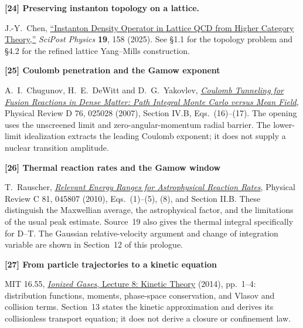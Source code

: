 \documentclass[11pt]{article}
\newcommand{\source}[3]{\par\medskip\hypertarget{src#1}{}\textbf{[#1] #2}\par\nopagebreak #3\par}
\begin{document}
\source{24}{Preserving instanton topology on a lattice.}{J.-Y.~Chen,
\href{https://arxiv.org/abs/2406.06673v3}{``Instanton Density Operator in
Lattice QCD from Higher Category Theory,''} \emph{SciPost Physics}
\textbf{19}, 158 (2025). See \S1.1 for the topology problem and \S4.2
for the refined lattice Yang--Mills construction.}


\source{25}{Coulomb penetration and the Gamow exponent}{A.~I.~Chugunov, H.~E.~DeWitt and D.~G.~Yakovlev, \href{https://arxiv.org/abs/0707.3500}{\emph{Coulomb Tunneling for Fusion Reactions in Dense Matter: Path Integral Monte Carlo versus Mean Field}}, Physical Review D 76, 025028 (2007), Section IV.B, Eqs.~(16)--(17). The opening uses the unscreened limit and zero-angular-momentum radial barrier. The lower-limit idealization extracts the leading Coulomb exponent; it does not supply a nuclear transition amplitude.}

\source{26}{Thermal reaction rates and the Gamow window}{T.~Rauscher, \href{https://arxiv.org/abs/1003.2802}{\emph{Relevant Energy Ranges for Astrophysical Reaction Rates}}, Physical Review C 81, 045807 (2010), Eqs.~(1)--(5), (8), and Section II.B. These distinguish the Maxwellian average, the astrophysical factor, and the limitations of the usual peak estimate. Source~19 also gives the thermal integral specifically for D--T. The Gaussian relative-velocity argument and change of integration variable are shown in Section~12 of this prologue.}

\source{27}{From particle trajectories to a kinetic equation}{MIT 16.55, \href{https://ocw.mit.edu/courses/16-55-ionized-gases-fall-2014/b7c22c3d68ab558bcc3a59867b710e1a_MIT16_55F14_Lecture8.pdf}{\emph{Ionized Gases}, Lecture 8: Kinetic Theory} (2014), pp.~1--4: distribution functions, moments, phase-space conservation, and Vlasov and collision terms. Section~13 states the kinetic approximation and derives its collisionless transport equation; it does not derive a closure or confinement law.}
\end{document}
